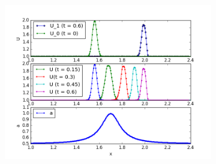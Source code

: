 \documentclass{article}
\begin{document}
\begin{figure}[h]
\begin{subfigure}{0.33\textwidth}
    \includegraphics[width=1\linewidth]{TVD_tests/lim_MC_a_hat_U0_gauss.png}
    \end{subfigure}
\end{figure}
\end{document}
